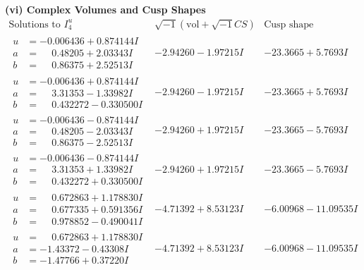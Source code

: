 \documentclass[1p]{elsarticle_modified}
\theoremstyle{definition}
\newcommand{\I}{\sqrt{-1}}
\begin{document}
\newpage\flushleft \textbf{(vi) Complex Volumes and Cusp Shapes}
$$\begin{array}{c|c|c}  
\text{Solutions to }I^u_{4}& \I (\text{vol} + \sqrt{-1}CS) & \text{Cusp shape}\\
 \hline 
\begin{aligned}
u &= -0.006436 + 0.874144 I \\
a &= \phantom{-}0.48205 + 2.03343 I \\
b &= \phantom{-}0.86375 + 2.52513 I\end{aligned}
 & -2.94260 - 1.97215 I & -23.3665 + 5.7693 I \\ \hline\begin{aligned}
u &= -0.006436 + 0.874144 I \\
a &= \phantom{-}3.31353 - 1.33982 I \\
b &= \phantom{-}0.432272 - 0.330500 I\end{aligned}
 & -2.94260 - 1.97215 I & -23.3665 + 5.7693 I \\ \hline\begin{aligned}
u &= -0.006436 - 0.874144 I \\
a &= \phantom{-}0.48205 - 2.03343 I \\
b &= \phantom{-}0.86375 - 2.52513 I\end{aligned}
 & -2.94260 + 1.97215 I & -23.3665 - 5.7693 I \\ \hline\begin{aligned}
u &= -0.006436 - 0.874144 I \\
a &= \phantom{-}3.31353 + 1.33982 I \\
b &= \phantom{-}0.432272 + 0.330500 I\end{aligned}
 & -2.94260 + 1.97215 I & -23.3665 - 5.7693 I \\ \hline\begin{aligned}
u &= \phantom{-}0.672863 + 1.178830 I \\
a &= \phantom{-}0.677335 + 0.591356 I \\
b &= \phantom{-}0.978852 - 0.490041 I\end{aligned}
 & -4.71392 + 8.53123 I & -6.00968 - 11.09535 I \\ \hline\begin{aligned}
u &= \phantom{-}0.672863 + 1.178830 I \\
a &= -1.43372 - 0.43308 I \\
b &= -1.47766 + 0.37220 I\end{aligned}
 & -4.71392 + 8.53123 I & -6.00968 - 11.09535 I \\ \hline\begin{aligned}

\end{aligned}
\end{array}$$
\end{document}
